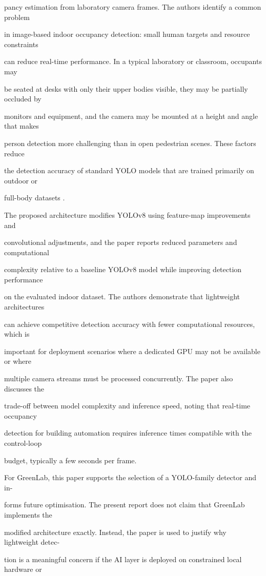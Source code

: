 pancy estimation from laboratory camera frames. The authors identify a common problem

in image-based indoor occupancy detection: small human targets and resource constraints

can reduce real-time performance. In a typical laboratory or classroom, occupants may

be seated at desks with only their upper bodies visible, they may be partially occluded by

monitors and equipment, and the camera may be mounted at a height and angle that makes

person detection more challenging than in open pedestrian scenes. These factors reduce

the detection accuracy of standard YOLO models that are trained primarily on outdoor or

full-body datasets \cite{zhang2026}.

The proposed architecture modiﬁes YOLOv8 using feature-map improvements and

convolutional adjustments, and the paper reports reduced parameters and computational

complexity relative to a baseline YOLOv8 model while improving detection performance

on the evaluated indoor dataset. The authors demonstrate that lightweight architectures

can achieve competitive detection accuracy with fewer computational resources, which is

important for deployment scenarios where a dedicated GPU may not be available or where

multiple camera streams must be processed concurrently. The paper also discusses the

trade-off between model complexity and inference speed, noting that real-time occupancy

detection for building automation requires inference times compatible with the control-loop

budget, typically a few seconds per frame.

For GreenLab, this paper supports the selection of a YOLO-family detector and in-

forms future optimisation. The present report does not claim that GreenLab implements the

modiﬁed architecture exactly. Instead, the paper is used to justify why lightweight detec-

tion is a meaningful concern if the AI layer is deployed on constrained local hardware or

